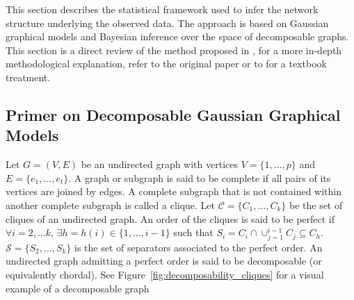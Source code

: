 This section describes the statistical framework used to infer the network structure underlying the observed data. The approach is based on Gaussian graphical models and Bayesian inference over the space of decomposable graphs. This section is a direct review of the method proposed in \textcite{donnet2012empirical}, for a more in-depth methodological explanation, refer to the original paper or to  \textcite{lauritzen1996graphical} for a textbook treatment.
\subsection{Primer on Decomposable Gaussian Graphical Models}
Let $G = (V,E)$ be an undirected graph with vertices $V = \{1,...,p\}$ and $E=\{e_1,...,e_t\}$. A graph or subgraph is said to be complete if all pairs of its vertices are joined by edges. A complete subgraph that is not contained within another complete subgraph is called a clique. Let $\mathcal{C}=\{C_1,...,C_k\}$ be the set of cliques of an undirected graph. An order of the cliques is said to be perfect if $\forall i =2,...k$, $\exists h = h(i) \in \{1,...,i-1\}$ such that $S_i = C_i \cap \cup_{j=1}^{i-1} C_j \subseteq C_h$. $\mathcal{S}=\{S_2,\dots,S_k\}$ is the set of separators associated to the perfect order. An undirected graph admitting a perfect order is said to be decomposable (or equivalently chordal). See Figure~\ref{fig:decomposability_cliques} for a visual example of a decomposable graph\\

